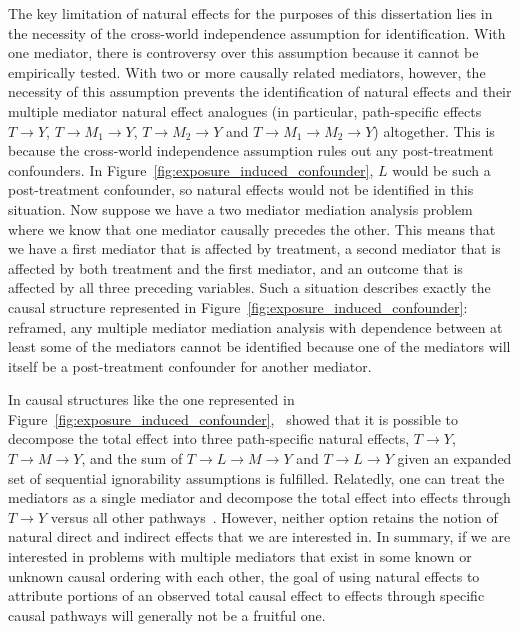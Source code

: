 The key limitation of natural effects for the purposes of this dissertation lies in the necessity of the cross-world 
independence assumption for identification. With one mediator, there is controversy over this assumption because it
cannot be empirically tested. With two or more causally related mediators, however, the necessity of this assumption
prevents the identification of natural effects and their multiple mediator natural effect analogues (in particular, 
path-specific effects $T \rightarrow Y$, $T \rightarrow M_{1} \rightarrow Y$, $T \rightarrow M_{2} \rightarrow Y$ and 
$T \rightarrow M_{1} \rightarrow M_{2} \rightarrow Y$) altogether. This 
is because the cross-world independence assumption rules out any post-treatment confounders. In 
Figure~\ref{fig:exposure_induced_confounder}, $L$ would be such a post-treatment confounder, so natural effects would
not be identified in this situation. Now suppose we have a two mediator mediation analysis problem where we know 
that one mediator causally precedes the other. This means that we have a first mediator that is affected by 
treatment, a second mediator that is affected by both treatment and the first mediator, and an outcome that is 
affected by all three preceding variables. Such a situation describes exactly the causal structure represented 
in Figure~\ref{fig:exposure_induced_confounder}: reframed, any multiple mediator mediation analysis with 
dependence between at least some of the mediators cannot be identified because one of the mediators will itself 
be a post-treatment confounder for another mediator. 

In causal structures like the one represented in 
Figure~\ref{fig:exposure_induced_confounder},~\cite{avinetal2005} showed that it is possible to 
decompose the total effect into three path-specific natural effects, $T \rightarrow Y$, 
$T \rightarrow M \rightarrow Y$, and the sum of $T \rightarrow L \rightarrow M \rightarrow Y$ and
$T \rightarrow L \rightarrow Y$ given an expanded set of sequential ignorability assumptions is fulfilled. 
Relatedly, one can treat the mediators as a single mediator and decompose the total effect into effects through
$T \rightarrow Y$ versus all other pathways~\citep{vanderweeleetal2014}. However, neither option retains the notion
of natural direct and indirect effects that we are interested in. In summary, if we are interested in problems with 
multiple mediators that exist in some known or unknown causal ordering with each other, the goal of using natural 
effects to attribute portions of an observed total causal effect to effects through specific causal pathways will 
generally not be a fruitful one. 

